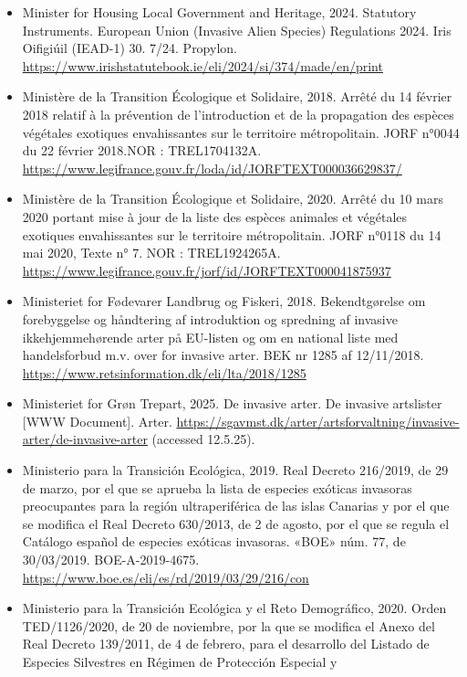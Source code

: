 \documentclass[
]{article}
\begin{document}
\begin{itemize}
  (B28719). 500. 9/11.
  \url{https://www.irishstatutebook.ie/eli/2011/si/477}
\item
  Minister for Housing Local Government and Heritage, 2024. Statutory
  Instruments. European Union (Invasive Alien Species) Regulations 2024.
  Iris Oifigiúil (IEAD-1) 30. 7/24. Propylon.
  \url{https://www.irishstatutebook.ie/eli/2024/si/374/made/en/print}
\item
  Ministère de la Transition Écologique et Solidaire, 2018. Arrêté du 14
  février 2018 relatif à la prévention de l'introduction et de la
  propagation des espèces végétales exotiques envahissantes sur le
  territoire métropolitain. JORF n°0044 du 22 février 2018.NOR :
  TREL1704132A.
  \url{https://www.legifrance.gouv.fr/loda/id/JORFTEXT000036629837/}
\item
  Ministère de la Transition Écologique et Solidaire, 2020. Arrêté du 10
  mars 2020 portant mise à jour de la liste des espèces animales et
  végétales exotiques envahissantes sur le territoire métropolitain.
  JORF n°0118 du 14 mai 2020, Texte n° 7. NOR : TREL1924265A.
  \url{https://www.legifrance.gouv.fr/jorf/id/JORFTEXT000041875937}
\item
  Ministeriet for Fødevarer Landbrug og Fiskeri, 2018. Bekendtgørelse om
  forebyggelse og håndtering af introduktion og spredning af invasive
  ikkehjemmehørende arter på EU-listen og om en national liste med
  handelsforbud m.v. over for invasive arter. BEK nr 1285 af 12/11/2018.
  \url{https://www.retsinformation.dk/eli/lta/2018/1285}
\item
  Ministeriet for Grøn Trepart, 2025. De invasive arter. De invasive
  artslister {[}WWW Document{]}. Arter.
  \url{https://sgavmst.dk/arter/artsforvaltning/invasive-arter/de-invasive-arter}
  (accessed 12.5.25).
\item
  Ministerio para la Transición Ecológica, 2019. Real Decreto 216/2019,
  de 29 de marzo, por el que se aprueba la lista de especies exóticas
  invasoras preocupantes para la región ultraperiférica de las islas
  Canarias y por el que se modifica el Real Decreto 630/2013, de 2 de
  agosto, por el que se regula el Catálogo español de especies exóticas
  invasoras. «BOE» núm. 77, de 30/03/2019. BOE-A-2019-4675.
  \url{https://www.boe.es/eli/es/rd/2019/03/29/216/con}
\item
  Ministerio para la Transición Ecológica y el Reto Demográfico, 2020.
  Orden TED/1126/2020, de 20 de noviembre, por la que se modifica el
  Anexo del Real Decreto 139/2011, de 4 de febrero, para el desarrollo
  del Listado de Especies Silvestres en Régimen de Protección Especial y

\end{itemize}
\end{document}
